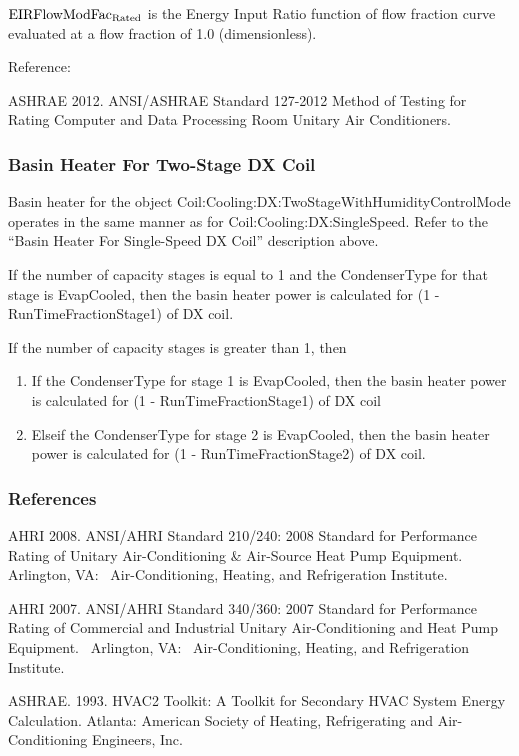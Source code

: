\(\rm{EIRFlowModFac}_{Rated}\) is the Energy Input Ratio function of flow fraction curve evaluated at a flow fraction of 1.0 (dimensionless).

Reference:

ASHRAE 2012. ANSI/ASHRAE Standard 127-2012 Method of Testing for Rating Computer and Data Processing Room Unitary Air Conditioners.

\subsubsection{Basin Heater For Two-Stage DX Coil}\label{basin-heater-for-two-stage-dx-coil}

Basin heater for the object Coil:Cooling:DX:TwoStageWithHumidityControlMode operates in the same manner as for Coil:Cooling:DX:SingleSpeed. Refer to the ``Basin Heater For Single-Speed DX Coil'' description above.

If the number of capacity stages is equal to 1 and the CondenserType for that stage is EvapCooled, then the basin heater power is calculated for (1 - RunTimeFractionStage1) of DX coil.

If the number of capacity stages is greater than 1, then

\begin{enumerate}
\item If the CondenserType for stage 1 is EvapCooled, then the basin heater power is calculated for (1 - RunTimeFractionStage1) of DX coil
\item Elseif the CondenserType for stage 2 is EvapCooled, then the basin heater power is calculated for (1 - RunTimeFractionStage2) of DX coil.
\end{enumerate}

\subsubsection{References}\label{references-2-002}

AHRI 2008. ANSI/AHRI Standard 210/240: 2008 Standard for Performance Rating of Unitary Air-Conditioning \& Air-Source Heat Pump Equipment.~ Arlington, VA:~ Air-Conditioning, Heating, and Refrigeration Institute.

AHRI 2007. ANSI/AHRI Standard 340/360: 2007 Standard for Performance Rating of Commercial and Industrial Unitary Air-Conditioning and Heat Pump Equipment.~ Arlington, VA:~ Air-Conditioning, Heating, and Refrigeration Institute.

ASHRAE. 1993. HVAC2 Toolkit: A Toolkit for Secondary HVAC System Energy Calculation. Atlanta: American Society of Heating, Refrigerating and Air-Conditioning Engineers, Inc.

